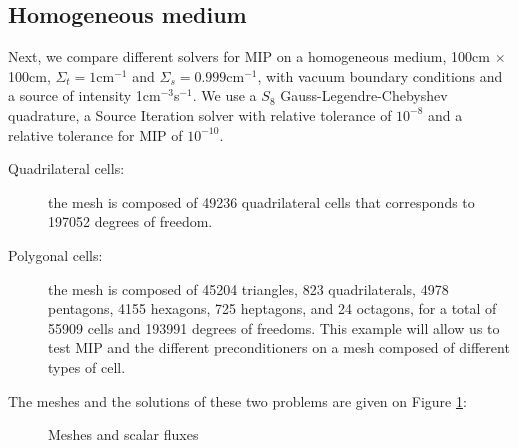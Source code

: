 \subsection{Homogeneous medium}
Next, we compare different solvers for MIP on a homogeneous medium, 100cm $\times$
100cm, $\Sigma_t=1$cm$^{-1}$ and $\Sigma_s=0.999$cm$^{-1}$, with vacuum boundary 
conditions and a source of intensity 1cm$^{-3}$s$^{-1}$. We use a $S_8$
Gauss-Legendre-Chebyshev quadrature, a Source Iteration solver with relative
tolerance of $10^{-8}$ and a relative tolerance for MIP of $10^{-10}$.
\begin{description}
  \item[Quadrilateral cells:] the mesh is composed of 49236 quadrilateral cells
    that corresponds to 197052 degrees of freedom.
  \item[Polygonal cells:] the mesh is composed of 45204 triangles, 823 
    quadrilaterals, 4978 pentagons, 4155 hexagons, 725 heptagons, and 24 
    octagons, for a total of 55909 cells and 193991 degrees of freedoms. This 
    example will allow us to test MIP and the different preconditioners on a 
    mesh composed of different types of cell.
\end{description}
The meshes and the solutions of these two problems are given on Figure
\ref{fig_meshes_phi}:
\begin{figure}[H]
\centering    
{}
\caption{Meshes and scalar fluxes}
\label{fig_meshes_phi}
\end{figure}

